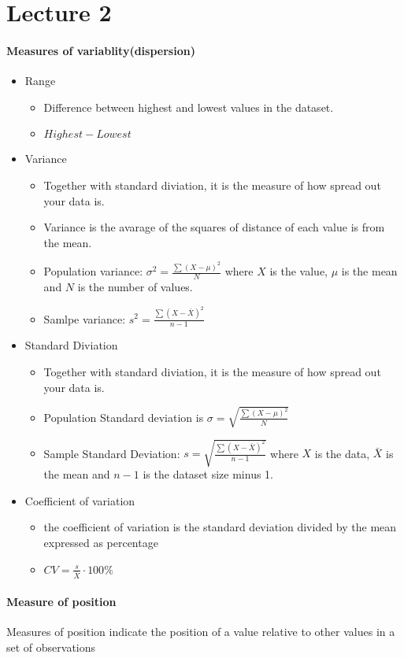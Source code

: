 \documentclass{article}
\newcommand{\paraheading}[1]{\paragraph{#1} \mbox{}} %
\begin{document}
\section{Lecture 2}
\paraheading{Measures of variablity(dispersion)}
\begin{itemize}
	\item Range
	\begin{itemize}
		\item Difference between highest and lowest values in the dataset.
		\item $Highest-Lowest$
	\end{itemize}
	\item Variance
	\begin{itemize}
		\item Together with standard diviation, it is the measure of how spread out your data is.
		\item Variance is the avarage of the squares of distance of each value is from the mean.
		\item Population variance: $\sigma^2 = \frac{\sum (X-\mu)^2}{N}$ where $X$ is the value, $\mu$ is the mean and $N$ is the number of values.
		\item Samlpe variance: $s^2 = \frac{\sum (X - \bar{X})^2}{n-1}$
	\end{itemize}
	\item Standard Diviation
	\begin{itemize}
		\item Together with standard diviation, it is the measure of how spread out your data is.
		\item Population Standard deviation is $\sigma = \sqrt{\frac{\sum (X-\mu)^2}{N}}$
		\item Sample Standard Deviation: $s = \sqrt{\frac{\sum (X - \bar{X})^2}{n-1}}$ where $X$ is the data, $\bar{X}$ is the mean and $n-1$ is the dataset size minus 1.
	\end{itemize}
	\item Coefficient of variation
	\begin{itemize}
		\item the coefficient of variation is the standard deviation divided by the mean expressed as percentage
		\item $CV = \frac{s}{\bar{X}}\cdot 100\%$
	\end{itemize}
\end{itemize}
\paraheading{Measure of position}
Measures of position indicate the position of a value relative to other values in a set of observations
\end{document}
